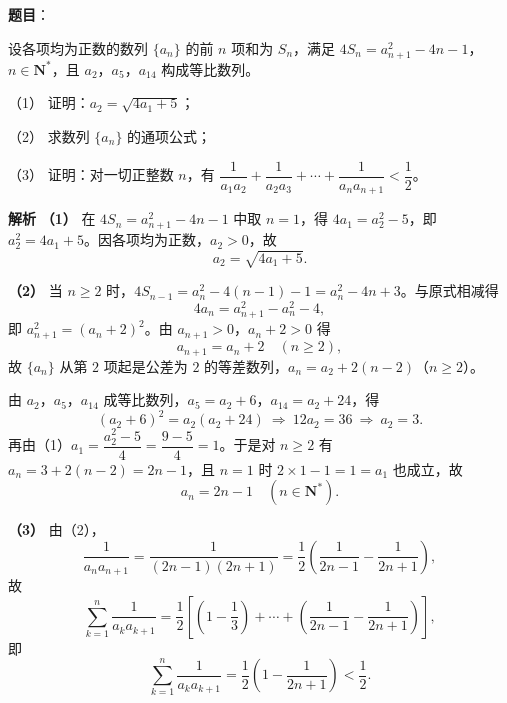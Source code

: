 \begin{answer}

\textbf{题目}：

设各项均为正数的数列 $\{a_n\}$ 的前 $n$ 项和为 $S_n$，满足 $4S_n=a_{n+1}^2-4n-1$，$n\in\mathbf N^*$，且 $a_2$，$a_5$，$a_{14}$ 构成等比数列。

（1） 证明：$a_2=\sqrt{4a_1+5}$；

（2） 求数列 $\{a_n\}$ 的通项公式；

（3） 证明：对一切正整数 $n$，有 $\dfrac1{a_1a_2}+\dfrac1{a_2a_3}+\cdots+\dfrac1{a_na_{n+1}}<\dfrac12$。

\textbf{解析}
\textbf{（1）} 在 $4S_n=a_{n+1}^2-4n-1$ 中取 $n=1$，得 $4a_1=a_2^2-5$，即 $a_2^2=4a_1+5$。因各项均为正数，$a_2>0$，故
\nopagebreak[4]
\[a_2=\sqrt{4a_1+5}.\]

\textbf{（2）} 当 $n\geqslant2$ 时，$4S_{n-1}=a_n^2-4(n-1)-1=a_n^2-4n+3$。与原式相减得
\nopagebreak[4]
\[4a_n=a_{n+1}^2-a_n^2-4,\]
即 $a_{n+1}^2=(a_n+2)^2$。由 $a_{n+1}>0$，$a_n+2>0$ 得
\nopagebreak[4]
\[a_{n+1}=a_n+2\quad(n\geqslant2),\]
故 $\{a_n\}$ 从第 $2$ 项起是公差为 $2$ 的等差数列，$a_n=a_2+2(n-2)$（$n\geqslant2$）。

由 $a_2$，$a_5$，$a_{14}$ 成等比数列，$a_5=a_2+6$，$a_{14}=a_2+24$，得
\nopagebreak[4]
\[(a_2+6)^2=a_2(a_2+24)\ \Longrightarrow\ 12a_2=36\ \Longrightarrow\ a_2=3.\]
再由（1）$a_1=\dfrac{a_2^2-5}4=\dfrac{9-5}4=1$。于是对 $n\geqslant2$ 有 $a_n=3+2(n-2)=2n-1$，且 $n=1$ 时 $2\times1-1=1=a_1$ 也成立，故
\nopagebreak[4]
\[a_n=2n-1\quad(n\in\mathbf N^*).\]

\textbf{（3）} 由（2），
\nopagebreak[4]
\[\frac1{a_na_{n+1}}=\frac1{(2n-1)(2n+1)}=\frac12\left(\frac1{2n-1}-\frac1{2n+1}\right),\]
故
\nopagebreak[4]
\[\sum_{k=1}^n\frac1{a_ka_{k+1}}=\frac12\left[\left(1-\frac13\right)+\cdots+\left(\frac1{2n-1}-\frac1{2n+1}\right)\right],\]
即
\nopagebreak[4]
\[\sum_{k=1}^n\frac1{a_ka_{k+1}}=\frac12\left(1-\frac1{2n+1}\right)<\frac12.\]




\end{answer}
